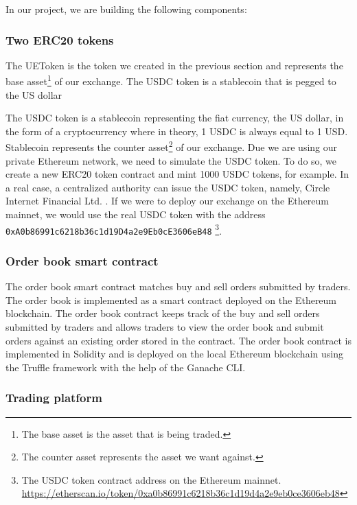 In our project, we are building the following components:



\subsubsection{Two ERC20 tokens}


The UEToken is the token we created in the previous section and represents
the base asset\footnote{The base asset is the asset that is being traded.} of our exchange. The USDC token is a stablecoin that is pegged to
the US dollar 

The USDC token is a stablecoin representing the fiat currency, the US dollar, in the form of a cryptocurrency where in theory, 1 USDC is always
equal to 1 USD. Stablecoin represents the counter asset\footnote{The counter asset represents the asset we want against.} of our exchange. Due we
are using our private Ethereum network, we need to simulate the USDC token. To do so, we create a new ERC20 token contract and mint 1000 USDC
tokens, for example. In a real case, a centralized authority can issue the USDC token, namely, Circle Internet Financial Ltd. \cite{usdc}. If
we were to deploy our exchange on the Ethereum mainnet, we would use the real USDC token with the address \texttt{0xA0b86991c6218b36c1d19D4a2e9Eb0cE3606eB48}
\footnote{The USDC token contract address on the Ethereum mainnet. \url{https://etherscan.io/token/0xa0b86991c6218b36c1d19d4a2e9eb0ce3606eb48}}.

\subsubsection{Order book smart contract}


The order book smart contract matches buy and sell orders submitted by traders.
The order book is implemented as a smart contract deployed on the Ethereum blockchain. The order book contract keeps track
of the buy and sell orders submitted by traders and allows traders to view the order book and submit orders against an existing order stored
in the contract. The order book contract is implemented in Solidity and is deployed on the local Ethereum blockchain using the Truffle framework with
the help of the Ganache CLI.


\subsubsection{Trading platform}


